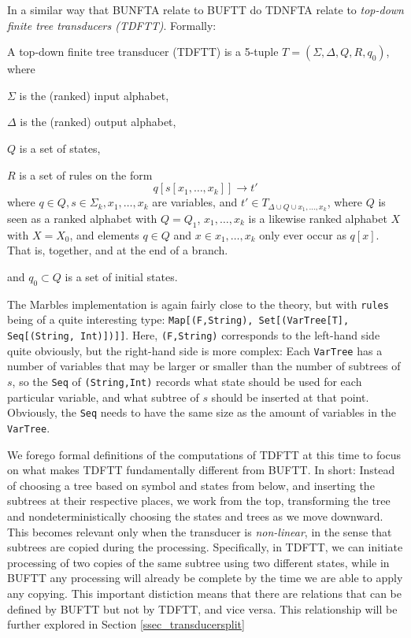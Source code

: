 In a similar way that BUNFTA relate to BUFTT do TDNFTA relate to
\emph{top-down finite tree transducers (TDFTT)}. Formally:

A top-down finite tree transducer (TDFTT) is a 5-tuple $T = (\Sigma,
\Delta, Q, R, q_0)$, where
\begin{compactitem}
\item $\Sigma$ is the (ranked) input alphabet,
\item $\Delta$ is the (ranked) output alphabet,
\item $Q$ is a set of states,
\item $R$ is a set of rules on the form
$$q[s[x_1,\ldots,x_k]] \rightarrow t'$$ where
$q \in Q, s \in \Sigma_k, x_1,\ldots,x_k$ are variables, and
$t' \in T_{\Delta \cup Q \cup {x_1,\ldots,x_k}}$, where $Q$ is seen as a
ranked alphabet with $Q = Q_1$, ${x_1,\ldots, x_k}$ is a likewise ranked
alphabet $X$ with $X=X_0$, and elements $q \in Q$ and $x \in
{x_1,\ldots,x_k}$ only ever occur as $q[x]$. That is, together, and at the
end of a branch.
\item and $q_0 \subset Q$ is a set of initial states.
\end{compactitem}

The Marbles implementation is again fairly close to the theory, but with
\texttt{rules} being of a quite interesting type: \texttt{Map[(F,String),
Set[(VarTree[T], Seq[(String, Int)])]]}. Here, \texttt{(F,String)}
corresponds to the left-hand side quite obviously, but the right-hand side
is more complex: Each \texttt{VarTree} has a number of variables that may
be larger or smaller than the number of subtrees of $s$, so the \texttt{Seq} of
\texttt{(String,Int)} records what state should be used for each particular
variable, and what subtree of $s$ should be inserted at that point.
Obviously, the \texttt{Seq} needs to have the same size as the amount of
variables in the \texttt{VarTree}.

We forego formal definitions of the computations of TDFTT at this time to
focus on what makes TDFTT fundamentally different from BUFTT. In short:
Instead of choosing a tree based on symbol and states from below, and
inserting the subtrees at their respective places, we work from the top,
transforming the tree and nondeterministically choosing the states and
trees as we move downward.  This becomes relevant only when the transducer
is \emph{non-linear}, in the sense that subtrees are copied during the
processing. Specifically, in TDFTT, we can initiate processing of two
copies of the same subtree using two different states, while in BUFTT any
processing will already be complete by the time we are able to apply any
copying. This important distiction means that there are relations that can
be defined by BUFTT but not by TDFTT, and vice versa. This relationship
will be further explored in Section \ref{ssec_transducersplit}


